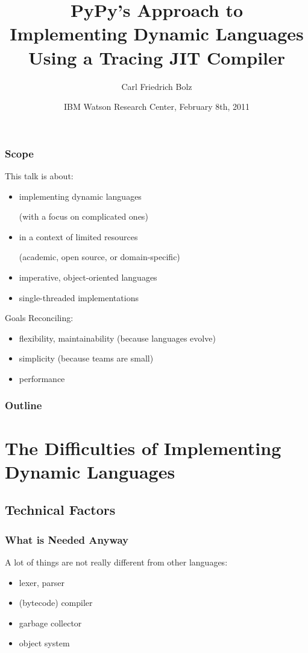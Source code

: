 \documentclass[utf8x]{beamer}
\title[PyPy Implements Dynamic Languages Using a Tracing JIT]{
PyPy's Approach to \\
Implementing Dynamic Languages \\
Using a Tracing JIT Compiler}
\author{Carl Friedrich Bolz}
\institute[Heinrich-Heine-Universität Düsseldorf]
{
  Institut für Informatik\\
  Heinrich-Heine-Universität Düsseldorf
}
\date{
IBM Watson Research Center, February 8th, 2011
}
\begin{document}
\begin{frame}
  \titlepage
\end{frame}


\begin{frame}
  \frametitle{Scope}
  This talk is about:

  \begin{itemize}
  \item implementing dynamic languages \par(with a focus on complicated ones)
  \item in a context of limited resources \par(academic, open source, or
    domain-specific)
  \item imperative, object-oriented languages
  \item single-threaded implementations
  \end{itemize}
  \pause
  \begin{block}{Goals}
    Reconciling:
    \begin{itemize}
    \item flexibility, maintainability (because languages evolve)
    \item simplicity (because teams are small)
    \item performance
    \end{itemize}
  \end{block}
\end{frame}

\begin{frame}
  \frametitle{Outline}
  \tableofcontents[pausesections]
\end{frame}

\section{The Difficulties of Implementing Dynamic Languages}

\subsection{Technical Factors}

\begin{frame}
  \frametitle{What is Needed Anyway}
  A lot of things are not really different from other languages:
  \begin{itemize}
      \item lexer, parser
      \item (bytecode) compiler
      \item garbage collector
      \item object system
  \end{itemize}
\end{frame}
\end{document}
